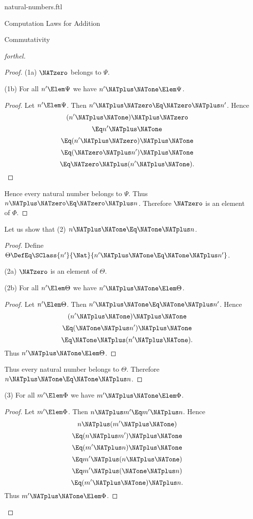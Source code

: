 \documentclass{stex}
\begin{document}
\begin{smodule}{natural-numbers.ftl}
\begin{sfragment}{Computation Laws for Addition}
\begin{sfragment}{Commutativity}
\begin{proof}[forthel]
\begin{proof}
        (1a) $\NATzero$ belongs to $\Psi$.

        (1b) For all $n' \Elem \Psi$ we have $n' \NATplus \NATone \Elem \Psi$.
        \begin{proof}
          Let $n' \Elem \Psi$.
          Then $n' \NATplus \NATzero \Eq \NATzero \NATplus n'$.
          Hence
          \[  (n' \NATplus \NATone) \NATplus \NATzero        \]
          \[    \Eq n' \NATplus \NATone          \]
          \[    \Eq (n' \NATplus \NATzero) \NATplus \NATone    \]
          \[    \Eq (\NATzero \NATplus n') \NATplus \NATone    \]
          \[    \Eq \NATzero \NATplus (n' \NATplus \NATone).   \]
        \end{proof}

        Hence every natural number belongs to $\Psi$.
        Thus $n \NATplus \NATzero \Eq \NATzero \NATplus n$.
        Therefore $\NATzero$ is an element of $\Phi$.
      \end{proof}

      Let us show that (2) $n \NATplus \NATone \Eq \NATone \NATplus n$.
      \begin{proof}
        Define $\Theta \DefEq \SClass{n'}{\Nat}{n' \NATplus \NATone \Eq \NATone \NATplus n'}$.

        (2a) $\NATzero$ is an element of $\Theta$.

        (2b) For all $n' \Elem \Theta$ we have $n' \NATplus \NATone \Elem \Theta$.
        \begin{proof}
          Let $n' \Elem \Theta$.
          Then $n' \NATplus \NATone \Eq \NATone \NATplus n'$.
          Hence
          \[  (n' \NATplus \NATone) \NATplus \NATone        \]
          \[    \Eq (\NATone \NATplus n') \NATplus \NATone    \]
          \[    \Eq \NATone \NATplus (n' \NATplus \NATone).   \]
          Thus $n' \NATplus \NATone \Elem \Theta$.
        \end{proof}

        Thus every natural number belongs to $\Theta$.
        Therefore $n \NATplus \NATone \Eq \NATone \NATplus n$.
      \end{proof}

      (3) For all $m' \Elem \Phi$ we have $m' \NATplus \NATone \Elem \Phi$.
      \begin{proof}
        Let $m' \Elem \Phi$.
        Then $n \NATplus m' \Eq m' \NATplus n$.
        Hence
        \[  n \NATplus (m'  \NATplus \NATone)       \]
        \[    \Eq (n \NATplus m') \NATplus \NATone    \]
        \[    \Eq (m' \NATplus n) \NATplus \NATone    \]
        \[    \Eq m' \NATplus (n \NATplus \NATone)    \]
        \[    \Eq m' \NATplus (\NATone \NATplus n)    \]
        \[    \Eq (m' \NATplus \NATone) \NATplus n.   \]
        Thus $m' \NATplus \NATone \Elem \Phi$.
      \end{proof}


\end{proof}
\end{sfragment}
\end{sfragment}
\end{smodule}
\end{document}
